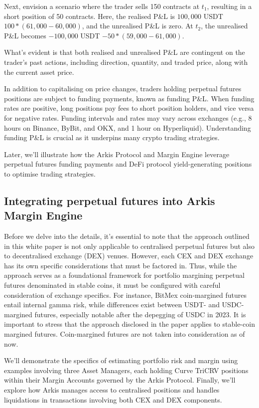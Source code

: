 \documentclass[conference]{IEEEtran}
\begin{document}
Next, envision a scenario where the trader sells 150 contracts at $t_{1}$, resulting in a short position of 50 contracts. Here, the realised P\&L is $100,000$ USDT $100 * (61,000 - 60,000)$, and the unrealised P\&L is zero. At $t_{2}$, the unrealised P\&L becomes $-100,000$ USDT $-50 * (59,000 - 61,000)$.

What’s evident is that both realised and unrealised P\&L are contingent on the trader's past actions, including direction, quantity, and traded price, along with the current asset price.

In addition to capitalising on price changes, traders holding perpetual futures positions are subject to funding payments, known as funding P\&L. When funding rates are positive, long positions pay fees to short position holders, and vice versa for negative rates. Funding intervals and rates may vary across exchanges (e.g., 8 hours on Binance, ByBit, and OKX, and 1 hour on Hyperliquid). Understanding funding P\&L is crucial as it underpins many crypto trading strategies.

Later, we'll illustrate how the Arkis Protocol and Margin Engine leverage perpetual futures funding payments and DeFi protocol yield-generating positions to optimise trading strategies.

\subsection{Integrating perpetual futures into Arkis Margin Engine}
Before we delve into the details, it's essential to note that the approach outlined in this white paper is not only applicable to centralised perpetual futures but also to decentralised exchange (DEX) venues. However, each CEX and DEX exchange has its own specific considerations that must be factored in. Thus, while the approach serves as a foundational framework for portfolio margining perpetual futures denominated in stable coins, it must be configured with careful consideration of exchange specifics. For instance, BitMex coin-margined futures entail internal gamma risk, while differences exist between USDT- and USDC-margined futures, especially notable after the depegging of USDC in 2023. It is important to stress that the approach disclosed in the paper applies to stable-coin margined futures. Coin-margined futures are not taken into consideration as of now.

We'll demonstrate the specifics of estimating portfolio risk and margin using examples involving three Asset Managers, each holding Curve TriCRV positions within their Margin Accounts governed by the Arkis Protocol. Finally, we'll explore how Arkis manages access to centralised positions and handles liquidations in transactions involving both CEX and DEX components.
\end{document}
